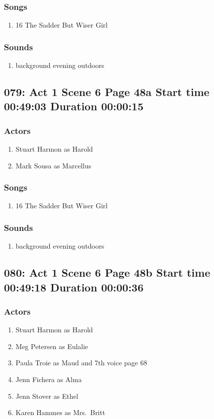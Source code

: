 \subsubsection{Songs}
\begin{enumerate}
\item 16 The Sadder But Wiser Girl
\end{enumerate}\subsubsection{Sounds}
\begin{enumerate}
\item background evening outdoors
\end{enumerate}
\subsection{079: Act 1 Scene 6 Page 48a Start time 00:49:03 Duration 00:00:15}

\subsubsection{Actors}
\begin{enumerate}
\item Stuart Harmon as Harold
\item Mark Sousa as Marcellus
\end{enumerate}

\subsubsection{Songs}
\begin{enumerate}
\item 16 The Sadder But Wiser Girl
\end{enumerate}\subsubsection{Sounds}
\begin{enumerate}
\item background evening outdoors
\end{enumerate}
\subsection{080: Act 1 Scene 6 Page 48b Start time 00:49:18 Duration 00:00:36}

\subsubsection{Actors}
\begin{enumerate}
\item Stuart Harmon as Harold
\item Meg Petersen as Eulalie
\item Paula Troie as Maud and 7th voice page 68
\item Jenn Fichera as Alma
\item Jenn Stover as Ethel
\item Karen Hammes as Mrs.~Britt
\end{enumerate}

